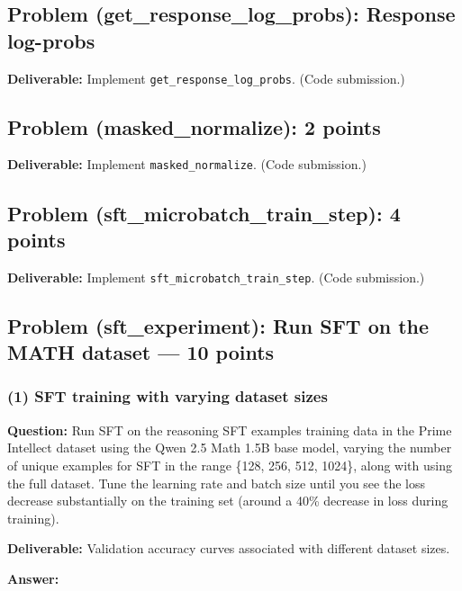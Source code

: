 \documentclass[11pt]{article}
\begin{document}
\subsection*{Problem (get\_response\_log\_probs): Response log-probs}

\textbf{Deliverable:} Implement \texttt{get\_response\_log\_probs}. (Code submission.)

\subsection*{Problem (masked\_normalize): 2 points}

\textbf{Deliverable:} Implement \texttt{masked\_normalize}. (Code submission.)

\subsection*{Problem (sft\_microbatch\_train\_step): 4 points}

\textbf{Deliverable:} Implement \texttt{sft\_microbatch\_train\_step}. (Code submission.)

\subsection*{Problem (sft\_experiment): Run SFT on the MATH dataset --- 10 points}

\subsubsection*{(1) SFT training with varying dataset sizes}

\textbf{Question:} Run SFT on the reasoning SFT examples training data in the Prime Intellect dataset using the Qwen 2.5 Math 1.5B base model, varying the number of unique examples for SFT in the range \{128, 256, 512, 1024\}, along with using the full dataset. Tune the learning rate and batch size until you see the loss decrease substantially on the training set (around a 40\% decrease in loss during training).

\textbf{Deliverable:} Validation accuracy curves associated with different dataset sizes.

\textbf{Answer:}

\end{document}
